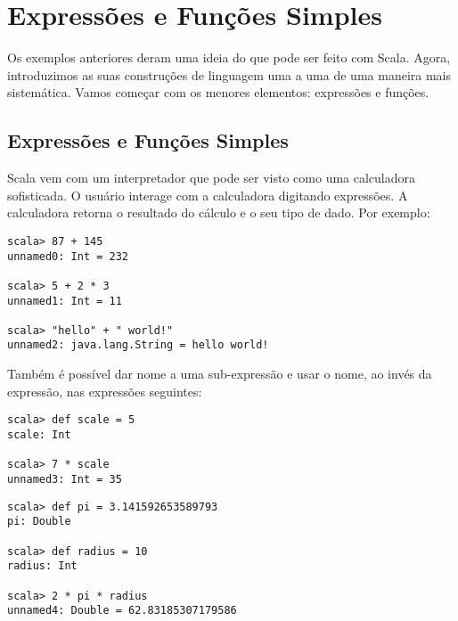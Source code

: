 \chapter{\label{chap:simple-funs}Expressões e Funções Simples}

Os exemplos anteriores deram uma ideia do que pode ser feito com Scala. Agora,
introduzimos as suas construções de linguagem uma a uma de uma maneira mais sistemática.
Vamos começar com os menores elementos: expressões e funções.


\section{Expressões e Funções Simples}

Scala vem com um interpretador que pode ser visto como uma calculadora sofisticada.
O usuário interage com a calculadora digitando expressões. A calculadora retorna o
resultado do cálculo e o seu tipo de dado. Por exemplo: 

\begin{lstlisting}
scala> 87 + 145
unnamed0: Int = 232

scala> 5 + 2 * 3
unnamed1: Int = 11

scala> "hello" + " world!"
unnamed2: java.lang.String = hello world!
\end{lstlisting}
Também é possível dar nome a uma sub-expressão e usar o nome, ao invés da expressão, 
nas expressões seguintes:
\begin{lstlisting}
scala> def scale = 5
scale: Int

scala> 7 * scale
unnamed3: Int = 35
\end{lstlisting}
\begin{lstlisting}
scala> def pi = 3.141592653589793
pi: Double

scala> def radius = 10
radius: Int

scala> 2 * pi * radius
unnamed4: Double = 62.83185307179586
\end{lstlisting}



